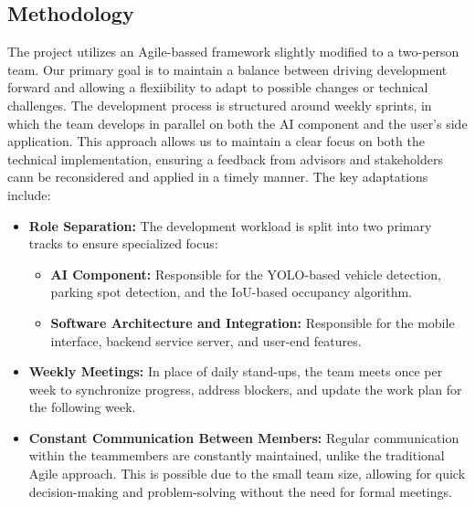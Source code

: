 \subsection{Methodology}
\label{subsection:methodology}
The project utilizes an Agile-bassed framework slightly modified to a two-person team.
Our primary goal is to maintain a balance between driving development forward and 
allowing a flexiibility to adapt to possible changes or technical challenges. 
The development process is structured around weekly sprints, in which the team develops in parallel on both 
the AI component and the user's side application. 
This approach allows us to maintain a clear focus on both the technical implementation, ensuring a feedback
from advisors and stakeholders cann be reconsidered and applied in a timely manner.
\linebreak 
The key adaptations include:
\begin{itemize}
    \item \textbf{Role Separation:} The development workload is split into two primary tracks 
    to ensure specialized focus:
    \begin{itemize}
        \item \textbf{AI Component:} Responsible for the YOLO-based
        vehicle detection, parking spot detection, and the
        IoU-based occupancy algorithm.
        \item \textbf{Software Architecture and Integration:} Responsible for the mobile interface, 
        backend service server, and user-end features.
    \end{itemize}
    \item \textbf{Weekly Meetings:}  In place of daily stand-ups, 
    the team meets once per week to synchronize progress, 
    address blockers, and update the work plan for the following week.
    \item \textbf{Constant Communication Between Members:} Regular communication within the teammembers are constantly maintained, 
    unlike the traditional Agile approach. This is possible due to the small team size, allowing for 
    quick decision-making and problem-solving without the need for formal meetings.
\end{itemize}

